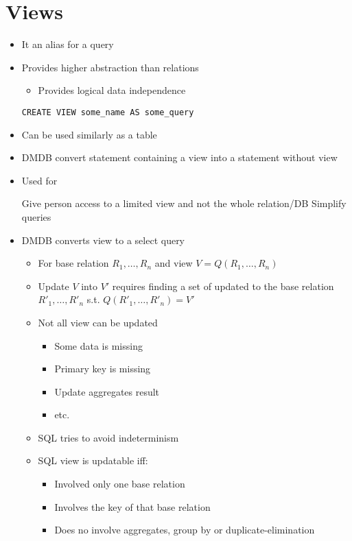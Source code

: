 
\section{Views}
\begin{itemize}
    \item It an alias for a query
    \item Provides higher abstraction than relations
        \begin{itemize}
            \item Provides logical data independence
        \end{itemize}
     \verb+CREATE VIEW some_name AS some_query+
    \item Can be used similarly as a table
    \item DMDB convert statement containing a view into a statement without view
    \item Used for
        \begin{itemize}
             Give person access to a limited view and not the whole relation/DB
             Simplify queries
        \end{itemize}
    \item DMDB converts view to a select query
        \begin{itemize}
            \item For base relation $R_1, \dots , R_n$ and view $V = Q(R_1, \dots , R_n)$
            \item Update $V$ into $V'$ requires finding a set of updated to the base relation $R'_1, \dots ,R'_n$ s.t. $Q(R'_1, \dots , R'_n) = V'$
            \item Not all view can be updated
                \begin{itemize}
                    \item Some data is missing
                    \item Primary key is missing
                    \item Update aggregates result
                    \item etc.
                \end{itemize}
            \item SQL tries to avoid indeterminism
            \item SQL view is updatable iff:
                \begin{itemize}
                    \item Involved only one base relation
                    \item Involves the key of that base relation
                    \item Does no involve aggregates, group by or duplicate-elimination
                \end{itemize}
        \end{itemize}
\end{itemize}
